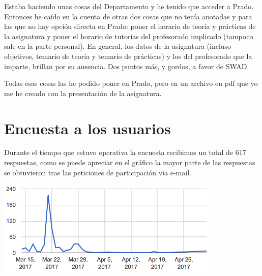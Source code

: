 \begin{enumerate}
  Estaba haciendo unas cosas del Departamento y he tenido que acceder a Prado. Entonces he caído en la cuenta de otras dos cosas que no tenía anotadas y para las que no hay opción directa en Prado: poner el horario de teoría y prácticas de la asignatura y poner el horario de tutorías del profesorado implicado (tampoco sale en la parte personal). En general, los datos de la asignatura (incluso objetivos, temario de teoría y temario de prácticas) y los del profesorado que la imparte, brillan por su ausencia. Dos puntos más, y gordos, a favor de SWAD.

  Todas esas cosas las he podido poner en Prado, pero en un archivo en pdf que yo me he creado con la presentación de la asignatura.


\end{enumerate}

\section{Encuesta a los usuarios}

Durante el tiempo que estuvo operativa la encuesta recibimos un total de 617 respuestas, como se puede apreciar en el gráfico la mayor parte de las respuestas se obtuvieron tras las peticiones de participación via e-mail.

    \includegraphics[width=0.8\textwidth]{../charts/00_fecha}
 	

